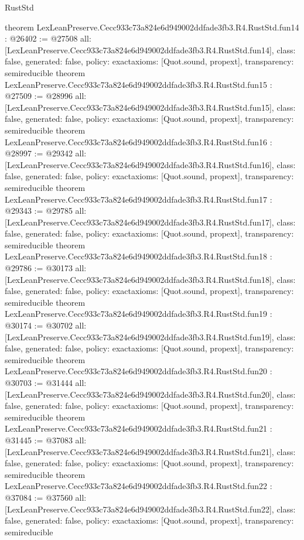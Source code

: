 \begin{lexlean}{RustStd}
\begin{coremodule}
{}
theorem LexLeanPreserve.Cecc933c73a824e6d949002ddfade3fb3.R4.RustStd.fun14 : @26402 := @27508 {
  all: [LexLeanPreserve.Cecc933c73a824e6d949002ddfade3fb3.R4.RustStd.fun14],
  class: false,
  generated: false,
  policy: exact{axioms: [Quot.sound, propext]},
  transparency: semireducible
}
theorem LexLeanPreserve.Cecc933c73a824e6d949002ddfade3fb3.R4.RustStd.fun15 : @27509 := @28996 {
  all: [LexLeanPreserve.Cecc933c73a824e6d949002ddfade3fb3.R4.RustStd.fun15],
  class: false,
  generated: false,
  policy: exact{axioms: [Quot.sound, propext]},
  transparency: semireducible
}
theorem LexLeanPreserve.Cecc933c73a824e6d949002ddfade3fb3.R4.RustStd.fun16 : @28997 := @29342 {
  all: [LexLeanPreserve.Cecc933c73a824e6d949002ddfade3fb3.R4.RustStd.fun16],
  class: false,
  generated: false,
  policy: exact{axioms: [Quot.sound, propext]},
  transparency: semireducible
}
theorem LexLeanPreserve.Cecc933c73a824e6d949002ddfade3fb3.R4.RustStd.fun17 : @29343 := @29785 {
  all: [LexLeanPreserve.Cecc933c73a824e6d949002ddfade3fb3.R4.RustStd.fun17],
  class: false,
  generated: false,
  policy: exact{axioms: [Quot.sound, propext]},
  transparency: semireducible
}
theorem LexLeanPreserve.Cecc933c73a824e6d949002ddfade3fb3.R4.RustStd.fun18 : @29786 := @30173 {
  all: [LexLeanPreserve.Cecc933c73a824e6d949002ddfade3fb3.R4.RustStd.fun18],
  class: false,
  generated: false,
  policy: exact{axioms: [Quot.sound, propext]},
  transparency: semireducible
}
theorem LexLeanPreserve.Cecc933c73a824e6d949002ddfade3fb3.R4.RustStd.fun19 : @30174 := @30702 {
  all: [LexLeanPreserve.Cecc933c73a824e6d949002ddfade3fb3.R4.RustStd.fun19],
  class: false,
  generated: false,
  policy: exact{axioms: [Quot.sound, propext]},
  transparency: semireducible
}
theorem LexLeanPreserve.Cecc933c73a824e6d949002ddfade3fb3.R4.RustStd.fun20 : @30703 := @31444 {
  all: [LexLeanPreserve.Cecc933c73a824e6d949002ddfade3fb3.R4.RustStd.fun20],
  class: false,
  generated: false,
  policy: exact{axioms: [Quot.sound, propext]},
  transparency: semireducible
}
theorem LexLeanPreserve.Cecc933c73a824e6d949002ddfade3fb3.R4.RustStd.fun21 : @31445 := @37083 {
  all: [LexLeanPreserve.Cecc933c73a824e6d949002ddfade3fb3.R4.RustStd.fun21],
  class: false,
  generated: false,
  policy: exact{axioms: [Quot.sound, propext]},
  transparency: semireducible
}
theorem LexLeanPreserve.Cecc933c73a824e6d949002ddfade3fb3.R4.RustStd.fun22 : @37084 := @37560 {
  all: [LexLeanPreserve.Cecc933c73a824e6d949002ddfade3fb3.R4.RustStd.fun22],
  class: false,
  generated: false,
  policy: exact{axioms: [Quot.sound, propext]},
  transparency: semireducible
}
\end{coremodule}
\end{lexlean}
